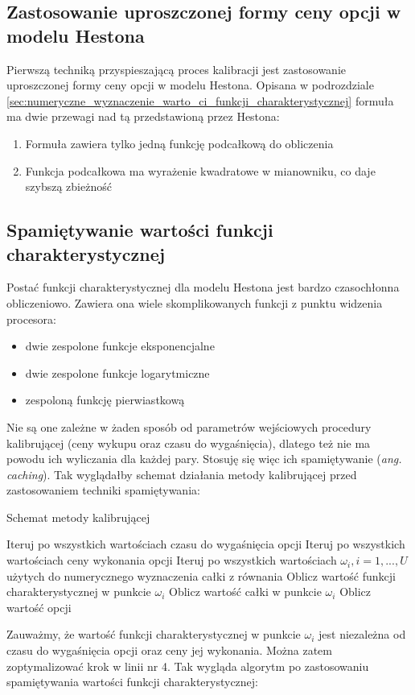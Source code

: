 \documentclass{pracamgr}
\begin{document}
\subsection{Zastosowanie uproszczonej formy ceny opcji w modelu Hestona} %
\label{sec:uproszczona_forma}

Pierwszą techniką przyspieszającą proces kalibracji jest zastosowanie uproszczonej formy ceny opcji w 
modelu Hestona. 
Opisana w podrozdziale \ref{sec:numeryczne_wyznaczenie_warto_ci_funkcji_charakterystycznej} 
formuła ma dwie przewagi nad tą przedstawioną przez Hestona:
\begin{enumerate}
  \item Formuła zawiera tylko jedną funkcję podcałkową do obliczenia
  \item Funkcja podcałkowa ma wyrażenie kwadratowe w mianowniku, co daje szybszą zbieżność  \cite{Attari}
\end{enumerate}

\subsection{Spamiętywanie wartości funkcji charakterystycznej}
Postać funkcji charakterystycznej dla modelu Hestona jest bardzo czasochłonna obliczeniowo. 
Zawiera ona wiele skomplikowanych funkcji z punktu widzenia procesora:
\begin{itemize}
  \item dwie zespolone funkcje eksponencjalne
  \item dwie zespolone funkcje logarytmiczne
  \item zespoloną funkcję pierwiastkową
\end{itemize}
Nie są one zależne w żaden sposób od parametrów wejściowych procedury kalibrującej (ceny wykupu oraz 
czasu do wygaśnięcia), dlatego też nie ma powodu ich wyliczania dla każdej pary. 
Stosuję się więc ich spamiętywanie (\textit{ang. caching}).
Tak wyglądałby schemat działania metody kalibrującej \cite{AcceleratingHeston} przed zastosowaniem 
techniki spamiętywania:
\begin{algorithm}[H]
\caption{Schemat metody kalibrującej}\label{euclid}
\begin{algorithmic}[1]
  \State Iteruj po wszystkich wartościach czasu do wygaśnięcia opcji
  \State Iteruj po wszystkich wartościach ceny wykonania opcji
  \State Iteruj po wszystkich wartościach $\omega_i, i = 1, ..., U $ użytych do numerycznego wyznaczenia całki z równania   
  \State Oblicz wartość funkcji charakterystycznej w punkcie $\omega_i$
  \State Oblicz wartość całki w punkcie $\omega_i$
  \State Oblicz wartość opcji
\end{algorithmic}
\label{alg:simulatedAnnealing}
\end{algorithm}
Zauważmy, że wartość funkcji charakterystycznej w punkcie $\omega_i$ jest niezależna od czasu do 
wygaśnięcia opcji oraz ceny jej wykonania. Można zatem zoptymalizować krok w linii nr 4. Tak wygląda 
algorytm po zastosowaniu spamiętywania wartości funkcji charakterystycznej:
\end{document}
